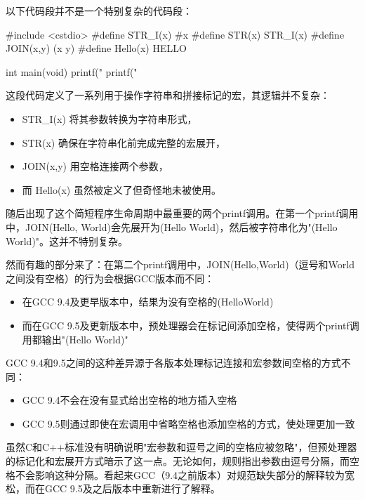
以下代码段并不是一个特别复杂的代码段：

\begin{cpp}
#include <cstdio>
#define STR_I(x) #x
#define STR(x) STR_I(x)
#define JOIN(x,y) (x y)
#define Hello(x) HELLO

int main(void){
  printf("%
  printf("%
}
\end{cpp}

这段代码定义了一系列用于操作字符串和拼接标记的宏，其逻辑并不复杂：

\begin{itemize}
\item 
STR\_I(x) 将其参数转换为字符串形式，

\item 
STR(x) 确保在字符串化前完成完整的宏展开，

\item 
JOIN(x,y) 用空格连接两个参数，

\item 
而 Hello(x) 虽然被定义了但奇怪地未被使用。
\end{itemize}

随后出现了这个简短程序生命周期中最重要的两个printf调用。在第一个printf调用中，JOIN(Hello, World)会先展开为(Hello World)，然后被字符串化为"(Hello World)"。这并不特别复杂。

然而有趣的部分来了：在第二个printf调用中，JOIN(Hello,World)（逗号和World之间没有空格）的行为会根据GCC版本而不同：

\begin{itemize}
\item 
在GCC 9.4及更早版本中，结果为没有空格的(HelloWorld)

\item 
而在GCC 9.5及更新版本中，预处理器会在标记间添加空格，使得两个printf调用都输出"(Hello World)"
\end{itemize}

GCC 9.4和9.5之间的这种差异源于各版本处理标记连接和宏参数间空格的方式不同：

\begin{itemize}
\item 
GCC 9.4不会在没有显式给出空格的地方插入空格

\item 
GCC 9.5则通过即使在宏调用中省略空格也添加空格的方式，使处理更加一致
\end{itemize}

虽然C和C++标准没有明确说明"宏参数和逗号之间的空格应被忽略"，但预处理器的标记化和宏展开方式暗示了这一点。无论如何，规则指出参数由逗号分隔，而空格不会影响这种分隔。看起来GCC（9.4之前版本）对规范缺失部分的解释较为宽松，而在GCC 9.5及之后版本中重新进行了解释。

